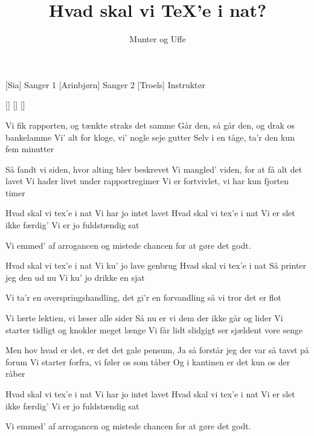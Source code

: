 \documentclass[a4paper,11pt]{article}
\title{Hvad skal vi TeX'e i nat?}
\author{Munter og Uffe}
\begin{document}
\maketitle

\begin{roles}
[Sia] Sanger 1
[Arinbjørn] Sanger 2
[Troels] Instruktør
\end{roles}

\begin{props}
[]
[]
[]
\end{props}

\begin{song}
 Vi fik rapporten, og tænkte straks det samme
Går den, så går den, og drak os bankelamme
Vi' alt for kloge, vi' nogle seje gutter
Selv i en tåge, ta'r den kun fem minutter

 Så fandt vi siden, hvor alting blev beskrevet
Vi mangled' viden, for at få alt det lavet
Vi hader livet under rapportregimer
Vi er fortvivlet, vi har kun fjorten timer

 Hvad skal vi tex'e i nat
 Vi har jo intet lavet
 Hvad skal vi tex'e i nat
Vi er slet ikke færdig'
 Vi er jo fuldstændig sat

 Vi emmed' af arrogancen og mistede chancen
for at gøre det godt.

 Hvad skal vi tex'e i nat
 Vi ku' jo lave genbrug
 Hvad skal vi tex'e i nat
 Så printer jeg den ud nu
 Vi ku' jo drikke en sjat

 Vi ta'r en overspringshandling, det gi'r en forvandling
så vi tror det er flot

 Vi lærte lektien, vi læser alle sider
Så nu er vi dem der ikke går og lider
Vi starter tidligt og knokler meget længe
Vi får lidt slidgigt ser sjældent vore senge

 Men hov hvad er det, er det det gale pensum,
Ja så forstår jeg der var så tavst på forum
Vi starter forfra, vi føler os som tåber
Og i kantinen er det kun os der råber

 Hvad skal vi tex'e i nat
 Vi har jo intet lavet
 Hvad skal vi tex'e i nat
Vi er slet ikke færdig'
 Vi er jo fuldstændig sat

 Vi emmed' af arrogancen og mistede chancen
for at gøre det godt.


\end{song}
\end{document}
